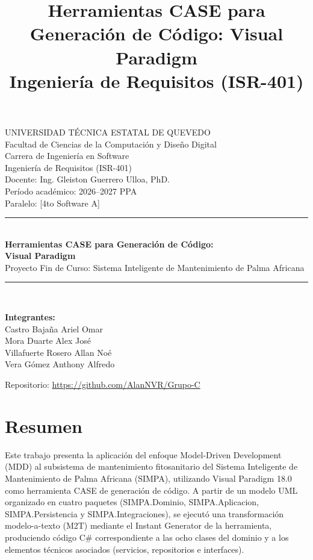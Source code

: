\documentclass[11pt,a4paper]{article}
\title{Herramientas CASE para Generación de Código: Visual Paradigm\\
\large Ingeniería de Requisitos (ISR-401)}
\author{}
\date{}
\begin{document}
\begin{titlepage}
\centering
{\large UNIVERSIDAD TÉCNICA ESTATAL DE QUEVEDO}\\
Facultad de Ciencias de la Computación y Diseño Digital\\
Carrera de Ingeniería en Software\\[1cm]
{\Large Ingeniería de Requisitos (ISR-401)}\\[0.3cm]
Docente: Ing. Gleiston Guerrero Ulloa, PhD.\\
Período académico: 2026--2027 PPA\\
Paralelo: [4to Software A]\\[1cm]
\rule{\linewidth}{0.4pt}\\[0.3cm]
{\LARGE\bfseries Herramientas CASE para Generación de Código:\\ Visual Paradigm}\\[0.3cm]
{\large Proyecto Fin de Curso: Sistema Inteligente de Mantenimiento de Palma Africana}\\[0.2cm]
\rule{\linewidth}{0.4pt}\\[1cm]
\begin{flushleft}
\centering\textbf{Integrantes:}\\
\centering Castro Bajaña Ariel Omar\\
\centering Mora Duarte Alex José\\
\centering Villafuerte Rosero Allan Noé\\
\centering Vera Gómez Anthony Alfredo
\end{flushleft}
\vfill
\sloppy
Repositorio: \url{https://github.com/AlanNVR/Grupo-C}
\end{titlepage}


\section*{Resumen}
Este trabajo presenta la aplicación del enfoque Model-Driven Development (MDD) al subsistema de mantenimiento fitosanitario del Sistema Inteligente de Mantenimiento de Palma Africana (SIMPA), utilizando Visual Paradigm 18.0 como herramienta CASE de generación de código. A partir de un modelo UML organizado en cuatro paquetes (SIMPA.Dominio, SIMPA.Aplicacion, SIMPA.Persistencia y SIMPA.Integraciones), se ejecutó una transformación modelo-a-texto (M2T) mediante el Instant Generator de la herramienta, produciendo código C\# correspondiente a las ocho clases del dominio y a los elementos técnicos asociados (servicios, repositorios e interfaces).
\end{document}
